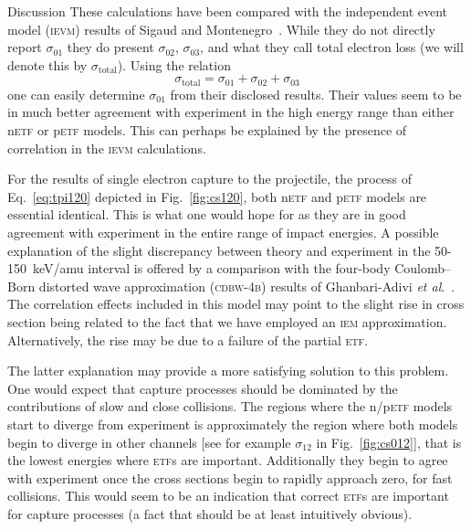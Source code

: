 \documentclass[aps, pra, reprint, groupedaddress, amsfonts, longbibliography,
               amsmath, amssymb, showpacs, nofootinbib]{revtex4-1}
\begin{document}
\begin{section}{Discussion \label{sec:disc}}
   These calculations have been compared with the independent event model (\textsc{ievm}) results of
   Sigaud and Montenegro~\cite{SM-03}. While they do not directly report $\sigma_{01}$ they do present
   $\sigma_{02}$, $\sigma_{03}$, and what they call total electron loss (we will denote this by
   $\sigma_\mathrm{total}$). Using the relation
   \begin{equation} \label{eq:total}
      \sigma_\mathrm{total} = \sigma_{01} + \sigma_{02} + \sigma_{03}
   \end{equation}
   one can easily determine $\sigma_{01}$ from their disclosed results. Their values seem to be in much
   better agreement with experiment in the high energy range than either n\textsc{etf} or p\textsc{etf}
   models. This can perhaps be explained by the presence of correlation in the \textsc{ievm}
   calculations.

   For the results of single electron capture to the projectile, the process of Eq.~\eqref{eq:tpi120}
   depicted in Fig.~\ref{fig:cs120}, both n\textsc{etf} and p\textsc{etf} models are essential
   identical. This is what one would hope for as they are in good agreement with experiment in the
   entire range of impact energies. A possible explanation of the slight discrepancy between theory and
   experiment in the 50-150~keV/amu interval is offered by a comparison with the four-body Coulomb–Born
   distorted wave approximation (\textsc{cdbw-4b}) results of Ghanbari-Adivi
   \textit{et al}.~\cite{GAG15}. The correlation effects included in this model may point to the slight
   rise in cross section being related to the fact that we have employed an \textsc{iem} approximation.
   Alternatively, the rise may be due to a failure of the partial \textsc{etf}.

   The latter explanation may provide a more satisfying solution to this problem. One would expect that
   capture processes should be dominated by the contributions of slow and close collisions. The regions
   where the n/p\textsc{etf} models start to diverge from experiment is approximately the region where
   both models begin to diverge in other channels [see for example $\sigma_{12}$ in
   Fig.~\ref{fig:cs012}], that is the lowest energies where \textsc{etf}s are important.
   Additionally they begin to agree with experiment once the cross sections begin to rapidly approach
   zero, for fast collisions. This would seem to be an indication that correct \textsc{etf}s are
   important for capture processes (a fact that should be at least intuitively obvious).


\end{section}
\end{document}
